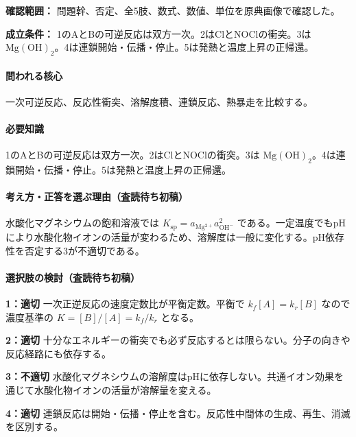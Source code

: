\noindent\textbf{確認範囲：} 問題幹、否定、全5肢、数式、数値、単位を原典画像で確認した。\par

\noindent\textbf{成立条件：} 1のAとBの可逆反応は双方一次。2はClとNOClの衝突。3は \(\mathrm{Mg(OH)_2}\)。4は連鎖開始・伝播・停止。5は発熱と温度上昇の正帰還。\par

\paragraph{問われる核心} 一次可逆反応、反応性衝突、溶解度積、連鎖反応、熱暴走を比較する。

\paragraph{必要知識} 1のAとBの可逆反応は双方一次。2はClとNOClの衝突。3は \(\mathrm{Mg(OH)_2}\)。4は連鎖開始・伝播・停止。5は発熱と温度上昇の正帰還。

\paragraph{考え方・正答を選ぶ理由（査読待ち初稿）} 水酸化マグネシウムの飽和溶液では \(K_{\mathrm{sp}}=a_{\mathrm{Mg^{2+}}}a_{\mathrm{OH^-}}^2\) である。一定温度でもpHにより水酸化物イオンの活量が変わるため、溶解度は一般に変化する。pH依存性を否定する3が不適切である。

\paragraph{選択肢の検討（査読待ち初稿）}\mbox{}\par

\noindent\textbf{1：適切} 一次正逆反応の速度定数比が平衡定数。平衡で \(k_f[A]=k_r[B]\) なので濃度基準の \(K=[B]/[A]=k_f/k_r\) となる。\par

\noindent\textbf{2：適切} 十分なエネルギーの衝突でも必ず反応するとは限らない。分子の向きや反応経路にも依存する。\par

\noindent\textbf{3：不適切} 水酸化マグネシウムの溶解度はpHに依存しない。共通イオン効果を通じて水酸化物イオンの活量が溶解量を変える。\par

\noindent\textbf{4：適切} 連鎖反応は開始・伝播・停止を含む。反応性中間体の生成、再生、消滅を区別する。\par

